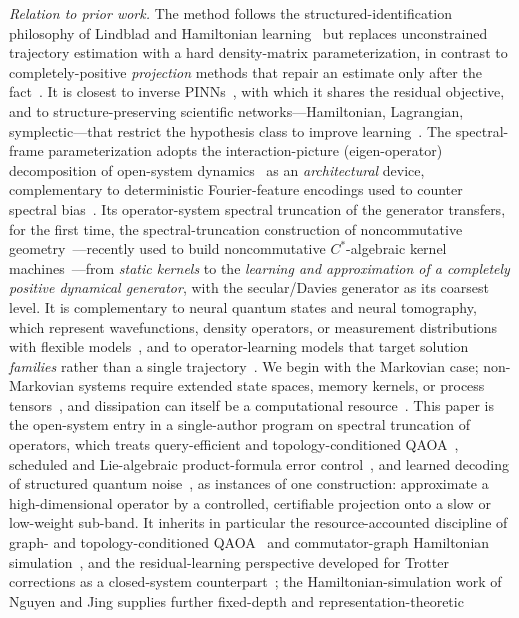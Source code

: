 \documentclass[twocolumn,aps,prxquantum,superscriptaddress,nofootinbib,floatfix,longbibliography]{revtex4-2}
\begin{document}
\emph{Relation to prior work.} The method follows the structured-identification philosophy of Lindblad and Hamiltonian learning~\cite{boulant2003robust,wang2017experimental} but replaces unconstrained trajectory estimation with a hard density-matrix parameterization, in contrast to completely-positive \emph{projection} methods that repair an estimate only after the fact~\cite{knee2018quantum}. It is closest to inverse PINNs~\cite{raissi2019physics,karniadakis2021physics,wang2022respecting}, with which it shares the residual objective, and to structure-preserving scientific networks---Hamiltonian, Lagrangian, symplectic---that restrict the hypothesis class to improve learning~\cite{greydanus2019hamiltonian,cranmer2020lagrangian,hairer2006geometric}. The spectral-frame parameterization adopts the interaction-picture (eigen-operator) decomposition of open-system dynamics~\cite{breuer2002theory,davies1974markovian} as an \emph{architectural} device, complementary to deterministic Fourier-feature encodings used to counter spectral bias~\cite{tancik2020fourier}. Its operator-system spectral truncation of the generator transfers, for the first time, the spectral-truncation construction of noncommutative geometry~\cite{connes2021spectral,vansuijlekom2021gromov}---recently used to build noncommutative $C^*$-algebraic kernel machines~\cite{hashimoto2024spectral}---from \emph{static kernels} to the \emph{learning and approximation of a completely positive dynamical generator}, with the secular/Davies generator as its coarsest level. It is complementary to neural quantum states and neural tomography, which represent wavefunctions, density operators, or measurement distributions with flexible models~\cite{carleo2017solving,torlai2018neural,yoshioka2020variational}, and to operator-learning models that target solution \emph{families} rather than a single trajectory~\cite{chen2018neural,lu2021learning,li2021fourier}. We begin with the Markovian case; non-Markovian systems require extended state spaces, memory kernels, or process tensors~\cite{denisov2019open,wolf2008assessing,banchi2018modelling,luchnikov2020machine}, and dissipation can itself be a computational resource~\cite{verstraete2009quantum}. This paper is the open-system entry in a single-author program on spectral truncation of operators, which treats query-efficient and topology-conditioned QAOA~\cite{huynh2026gctr,huynh2026gctrcalpro,huynh2026meascost,huynh2026certqb,huynh2026paramxferB,huynh2026ostqaoa,huynh2026topoqaoa}, scheduled and Lie-algebraic product-formula error control~\cite{huynh2026topoham,huynh2026lie}, and learned decoding of structured quantum noise~\cite{huynh2026gnndec,huynh2026topoqec,huynh2026covdec,huynh2026fiber}, as instances of one construction: approximate a high-dimensional operator by a controlled, certifiable projection onto a slow or low-weight sub-band. It inherits in particular the resource-accounted discipline of graph- and topology-conditioned QAOA~\cite{huynh2026gctr,huynh2026topoqaoa} and commutator-graph Hamiltonian simulation~\cite{huynh2026topoham}, and the residual-learning perspective developed for Trotter corrections as a closed-system counterpart~\cite{huynh2026lie}; the Hamiltonian-simulation work of Nguyen and Jing supplies further fixed-depth and representation-theoretic 
\end{document}
